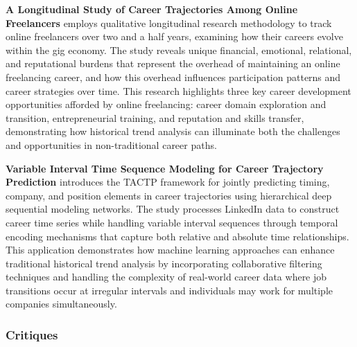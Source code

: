 \documentclass[../main.tex]{subfiles}
\begin{document}
\textbf{A Longitudinal Study of Career Trajectories Among Online Freelancers} \parencite{carnegie2018} employs qualitative longitudinal research methodology to track online freelancers over two and a half years, examining how their careers evolve within the gig economy. The study reveals unique financial, emotional, relational, and reputational burdens that represent the overhead of maintaining an online freelancing career, and how this overhead influences participation patterns and career strategies over time. This research highlights three key career development opportunities afforded by online freelancing: career domain exploration and transition, entrepreneurial training, and reputation and skills transfer, demonstrating how historical trend analysis can illuminate both the challenges and opportunities in non-traditional career paths.


\textbf{Variable Interval Time Sequence Modeling for Career Trajectory Prediction} \parencite{wang2021} introduces the TACTP framework for jointly predicting timing, company, and position elements in career trajectories using hierarchical deep sequential modeling networks. The study processes LinkedIn data to construct career time series while handling variable interval sequences through temporal encoding mechanisms that capture both relative and absolute time relationships. This application demonstrates how machine learning approaches can enhance traditional historical trend analysis by incorporating collaborative filtering techniques and handling the complexity of real-world career data where job transitions occur at irregular intervals and individuals may work for multiple companies simultaneously.

\subsubsection{Critiques}
\end{document}
